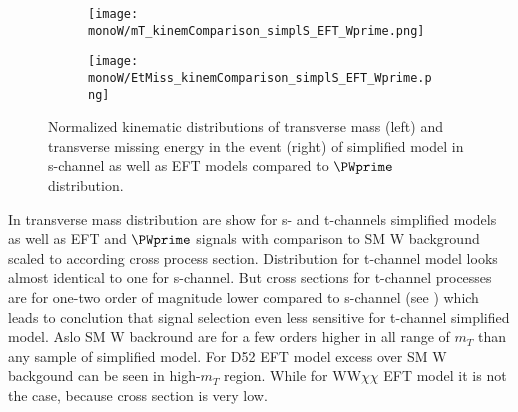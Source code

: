 
\begin{figure}[hb]

\begin{subfigure}{.5\textwidth}
  \centering
  \texttt{[image: monoW/mT\_kinemComparison\_simplS\_EFT\_Wprime.png]}
\end{subfigure}%
\begin{subfigure}{.5\textwidth}
  \centering
  \texttt{[image: monoW/EtMiss\_kinemComparison\_simplS\_EFT\_Wprime.png]}
\end{subfigure}

\caption{Normalized kinematic distributions of transverse mass (left) and transverse missing energy in the event (right) of simplified model in s-channel as well as EFT models compared to $\PWprime$ distribution.}
  \label{fig:kinematicsSChannel}
\end{figure}

In  transverse mass distribution are show for s- and t-channels simplified models as well as EFT and $\PWprime$ signals with comparison to SM W background 
scaled to according cross process section. Distribution for t-channel model looks almost identical to one for s-channel. 
But cross sections for t-channel processes are for one-two order of magnitude lower compared to s-channel (see ) which leads to conclution
that signal selection even less sensitive for t-channel simplified model. Aslo SM W backround are for a few orders higher in all range of $m_{T}$ than any sample of simplified model.
For D52 EFT model excess over SM W backgound can be seen in high-$m_{T}$ region. While for WW$\chi\chi$ EFT model it is not the case, because cross section is very low.


